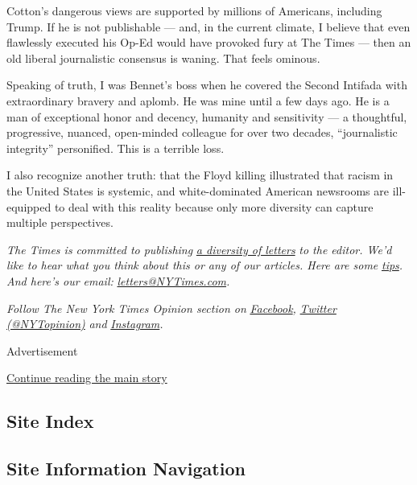 Cotton's dangerous views are supported by millions of Americans,
including Trump. If he is not publishable --- and, in the current
climate, I believe that even flawlessly executed his Op-Ed would have
provoked fury at The Times --- then an old liberal journalistic
consensus is waning. That feels ominous.

Speaking of truth, I was Bennet's boss when he covered the Second
Intifada with extraordinary bravery and aplomb. He was mine until a few
days ago. He is a man of exceptional honor and decency, humanity and
sensitivity --- a thoughtful, progressive, nuanced, open-minded
colleague for over two decades, ``journalistic integrity'' personified.
This is a terrible loss.

I also recognize another truth: that the Floyd killing illustrated that
racism in the United States is systemic, and white-dominated American
newsrooms are ill-equipped to deal with this reality because only more
diversity can capture multiple perspectives.

\emph{The Times is committed to publishing}
\href{https://www.nytimes3xbfgragh.onion/2019/01/31/opinion/letters/letters-to-editor-new-york-times-women.html}{\emph{a
diversity of letters}} \emph{to the editor. We'd like to hear what you
think about this or any of our articles. Here are some}
\href{https://help.nytimes3xbfgragh.onion/hc/en-us/articles/115014925288-How-to-submit-a-letter-to-the-editor}{\emph{tips}}\emph{.
And here's our email:}
\href{mailto:letters@NYTimes.com}{\emph{letters@NYTimes.com}}\emph{.}

\emph{Follow The New York Times Opinion section on}
\href{https://www.facebookcorewwwi.onion/nytopinion}{\emph{Facebook}}\emph{,}
\href{http://twitter.com/NYTOpinion}{\emph{Twitter (@NYTopinion)}}
\emph{and}
\href{https://www.instagram.com/nytopinion/}{\emph{Instagram}}\emph{.}

Advertisement

\protect\hyperlink{after-bottom}{Continue reading the main story}

\hypertarget{site-index}{%
\subsection{Site Index}\label{site-index}}

\hypertarget{site-information-navigation}{%
\subsection{Site Information
Navigation}\label{site-information-navigation}}

